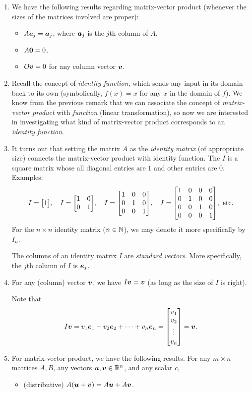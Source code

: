 \begin{enumerate}
\item We have the following results regarding matrix-vector product (whenever
the sizes of the matrices involved are proper):
\begin{itemize}
\item \(A\vb*{e}_{j}=\vb*{a}_{j}\), where \(\vb*{a}_{j}\) is the \(j\)th column of \(A\).
\item \(A\vb*{0}=0\).
\item \(O\vb*{v}=0\) for any column vector \(\vb*{v}\).
\end{itemize}

\item Recall the concept of \emph{identity function}, which sends any input in
its domain back to its own (symbolically, \(f(x)=x\) for any \(x\) in the
domain of \(f\)). We know from the previous remark that we can associate the
concept of \emph{matrix-vector product} with \emph{function} (linear
transformation), so now we are interested in investigating what kind of
matrix-vector product corresponds to an \emph{identity function}.

\item It turns out that setting the matrix \(A\) as the \emph{identity matrix}
(of appropriate size) connects the matrix-vector product with identity
function. The  \(I\) is a square matrix whose all diagonal
entries are \(1\) and other entries are \(0\). Examples:
\[
I=\mqty[\dmat[0]{1}],\quad
I=\mqty[\dmat[0]{1,1}],\quad
I=\mqty[\dmat[0]{1,1,1}],\quad
I=\mqty[\dmat[0]{1,1,1,1}],\text{ etc.}
\]
For the \(n\times n\) identity matrix (\(n\in\mathbb{N}\)), we may denote it more
specifically by \(I_{n}\).

\begin{note}
The columns of an identity matrix \(I\) are \emph{standard vectors}. More
specifically, the \(j\)th column of \(I\) is \(\vb*{e}_{j}\).
\end{note}
\item \label{it:identity-matrix-vec-mult}
For any (column) vector \(\vb*{v}\), we have \(I\vb*{v}=\vb*{v}\) (as
long as the size of \(I\) is right).

\begin{pf}
Note that
\[
I\vect{v}=v_{1}\vect{e}_{1}+v_2\vect{e}_{2}+\dotsb+v_{n}\vect{e}_{n}
=\mqty[v_1\\v_2\\\vdots\\v_n]=\vect{v}.
\]
\end{pf}
\item \label{it:matrix-vec-dist-asso}
For matrix-vector product, we have the following results.  For any
\(m\times n\) matrices \(A,B\), any vectors \(\vb*{u},\vb*{v}\in\mathbb{R}^n\), and
any scalar \(c\),
\begin{itemize}
\item (distributive) \(A(\vb*{u}+\vb*{v})=A\vb*{u}+A\vb*{v}\).


\end{itemize}
\end{enumerate}
